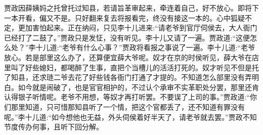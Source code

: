 \begin{parag}
    贾政因薛姨妈之托曾托过知县，若请旨革审起来，牵连着自己，好不放心。即将下一本开看，偏又不是。只好翻来复去将报看完，终没有接这一本的。心中狐疑不定，更加害怕起来。正在纳闷，只见李十儿进来:“请老爷到官厅伺侯去，大人衙门已经打了二鼓了。”贾政只是发怔，没有听见。李十儿又请了一遍。贾政道:“这便怎么处？”李十儿道:“老爷有什么心事？”贾政将看报之事说了一遍。李十儿道:“老爷放心。若是部里这么办了，还算便宜薛大爷呢。奴才在京的时侯听见，薛大爷在店里叫了好些媳妇，都喝醉了生事，直把个当槽儿的活活打死的。奴才听见不但是托了知县，还求琏二爷去花了好些钱各衙门打通了才提的。不知道怎么部里没有弄明白。如今就是闹破了，也是官官相护的，不过认个承审不实革职处分罢，那里还肯认得银子听情呢。老爷不用想，等奴才再打听罢。不要误了上司的事。”贾政道:“你们那里知道，只可惜那知县听了一个情，把这个官都丢了，还不知道有罪没有呢。”李十儿道:“如今想他也无益，外头伺侯着好半天了，请老爷就去罢。”贾政不知节度传办何事，且听下回分解。
\end{parag}